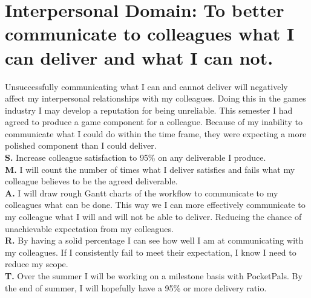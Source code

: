 \documentclass{scrartcl}
\begin{document}
\section{Interpersonal Domain: To better communicate to colleagues what I can deliver and what I can not.}
Unsuccessfully communicating what I can and cannot deliver will negatively affect my interpersonal relationships with my colleagues. Doing this in the games industry I may develop a reputation for being unreliable. This semester I had agreed to produce a game component for a colleague. Because of my inability to communicate what I could do within the time frame, they were expecting a more polished component than I could deliver.  \\
\textbf{S.}   Increase colleague satisfaction to 95\% on any deliverable I  produce. \\
\textbf{M.}  I will count the number of times what I deliver satisfies and fails what my colleague believes to be the agreed deliverable.  \\
\textbf{A.}  I will draw rough Gantt charts of the workflow to communicate to my colleagues what can be done. This way we I can more effectively communicate to my colleague what I will and will not be able to deliver. Reducing the chance of unachievable expectation from my colleagues.\\
\textbf{R.}  By having a solid percentage I can see how well I am at communicating with my colleagues. If I consistently fail to meet their expectation, I know I need to reduce my scope. \\
\textbf{T.} Over the summer I will be working on a milestone basis with PocketPals. By the end of summer, I will hopefully have a 95\%  or more delivery ratio.\\
\end{document}
